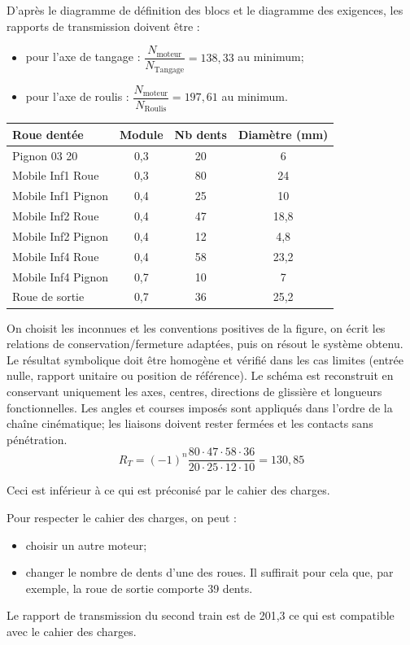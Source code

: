 \begin{corrigebox}
D'après le diagramme de définition des blocs et le diagramme des exigences, les rapports de transmission doivent être : 
\begin{itemize}
\item pour l'axe de tangage : $\dfrac{N_{\text{moteur}}}{N_{\text{Tangage}}}=138,33$ au minimum; 
\item pour l'axe de roulis :  $\dfrac{N_{\text{moteur}}}{N_{\text{Roulis}}}= 197,61$ au minimum.
\end{itemize}
\begin{center}
\begin{tabular}{lccc}
\hline
\textbf{Roue dentée} & \textbf{Module} & \textbf{Nb dents} & \textbf{Diamètre (mm)}\\
\hline
Pignon 03 20 & 0,3 &20        & 6		\\ 
Mobile Inf1 Roue & 0,3 & 80  & 24 	\\ 
Mobile Inf1 Pignon & 0,4 & 25 & 10	\\ 
Mobile Inf2 Roue & 0,4 & 47   & 18,8	\\ 
Mobile Inf2 Pignon & 0,4 & 12 & 4,8	\\ 
Mobile Inf4 Roue & 0,4 & 58   & 23,2	\\ 
Mobile Inf4 Pignon & 0,7 & 10 & 7	\\  
Roue de sortie & 0,7 & 36      & 25,2 \\ \hline
\end{tabular}
\end{center}
On choisit les inconnues et les conventions positives de la figure,
        on écrit les relations de conservation/fermeture adaptées, puis on résout le
        système obtenu. Le résultat symbolique doit être homogène et vérifié dans les cas
        limites (entrée nulle, rapport unitaire ou position de référence).
Le schéma est reconstruit en conservant uniquement les axes, centres,
        directions de glissière et longueurs fonctionnelles. Les angles et courses imposés
        sont appliqués dans l'ordre de la chaîne cinématique; les liaisons doivent rester
        fermées et les contacts sans pénétration.
$$
R_T = (-1)^n \dfrac{80\cdot 47 \cdot 58 \cdot 36}{20\cdot 25\cdot 12 \cdot 10 } = 130,85
$$

Ceci est inférieur à ce qui est préconisé par le cahier des charges. 

Pour respecter le cahier des charges, on peut :
\begin{itemize}
\item choisir un autre moteur;
\item changer le nombre de dents d'une des roues. Il suffirait pour cela que,  par exemple, la roue de sortie comporte 39 dents. 
\end{itemize}
Le rapport de transmission du second train est de 201,3 ce qui est compatible avec le cahier des charges.
\end{corrigebox}
